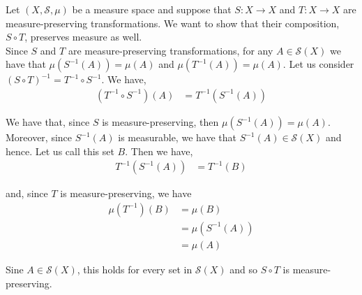 \documentclass[12pt]{article}
\newenvironment{problem}[2][Problem]{\begin{trivlist}
\item[\hskip \labelsep {\bfseries #1}\hskip \labelsep {\bfseries #2.}]}{\end{trivlist}}
\begin{document}
\newpage
\begin{problem}{2}
\end{problem}

Let $(X, \mathcal{S}, \mu)$ be a measure space and suppose that $S: X \to X$ and $T: X \to X$ are measure-preserving transformations. We want to show that their composition, $S \circ T$, preserves measure as well.\\

Since $S$ and $T$ are measure-preserving transformations, for any $A \in \mathcal{S}(X)$ we have that $\mu(S^{-1}(A)) = \mu(A)$ and $\mu(T^{-1}(A)) = \mu(A)$. Let us consider $(S \circ T)^{-1} = T^{-1} \circ S^{-1}$. We have,
\begin{align*}
(T^{-1} \circ S^{-1})(A) &= T^{-1}(S^{-1}(A))
\end{align*}

We have that, since $S$ is measure-preserving, then $\mu(S^{-1}(A)) = \mu(A)$. Moreover, since $S^{-1}(A)$ is measurable, we have that $S^{-1}(A) \in \mathcal{S}(X)$ and hence. Let us call this set $B$. Then we have,
\begin{align*}
T^{-1}(S^{-1}(A)) &= T^{-1}(B)
\end{align*}

and, since $T$ is measure-preserving, we have
\begin{align*}
\mu(T^{-1})(B) &= \mu(B)\\
&= \mu(S^{-1}(A))\\
&= \mu(A)
\end{align*} 

Sine $A \in \mathcal{S}(X)$, this holds for every set in $\mathcal{S}(X)$ and so $S \circ T$ is measure-preserving.

\begin{problem}{3}
\end{problem}
\end{document}
